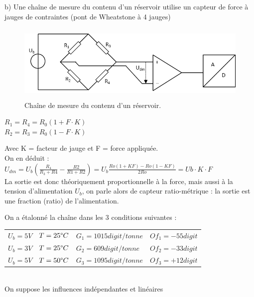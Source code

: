 \documentclass[main.tex]{subfiles}
\begin{document}
b)	Une chaîne de mesure du contenu d'un réservoir utilise un capteur de force à jauges de contraintes (pont de Wheatstone à 4 jauges)

\begin{figure}[h!]
    \centering
    \includegraphics[height=3.7cm]{assets/figures/Exercice_3_5_c.PNG}
    \caption{Chaîne de mesure du contenu d'un réservoir.}
    \label{fig:Exercice_3_5_c}
\end{figure}

\begin{center}
    $R_1 = R_4 = R_0(1 + F \cdot K)$\\
    $R_2 = R_3 = R_0(1 - F \cdot K)$\\
\end{center}

Avec K = facteur de jauge et F = force appliquée.\\

On en déduit :	$U_{dm} = U_b ( \frac{ R_4}{R_3+R4} - \frac{R2}{R1+R2} ) = U_b \frac{ Ro(1+KF) -Ro(1-KF)}{2Ro}  = Ub \cdot K \cdot F$ \\
La sortie est donc théoriquement proportionnelle à la force, mais aussi à la tension d'alimentation $U_b$, on parle alors de capteur ratio-métrique : la sortie est une fraction (ratio) de l'alimentation.

On a étalonné la chaîne dans les 3 conditions suivantes :\\

\begin {center}
\begin{tabular}{llll}
    $U_b = 5V$ & $T=25 \degree C$ & $G_1 = 1015 digit/tonne$ & $Of_1 = -55 digit$ \\
    $U_b = 3V$ & $T=25 \degree C$ & $G_2 = 609 digit/tonne$  & $Of_2 = -33 digit$ \\
    $U_b = 5V$ & $T=50 \degree C$ & $G_3 = 1095 digit/tonne$ & $Of_3 = +12 digit$ \\
\end{tabular}
\end{center}
~\\
On suppose les influences indépendantes et linéaires
\end{document}
